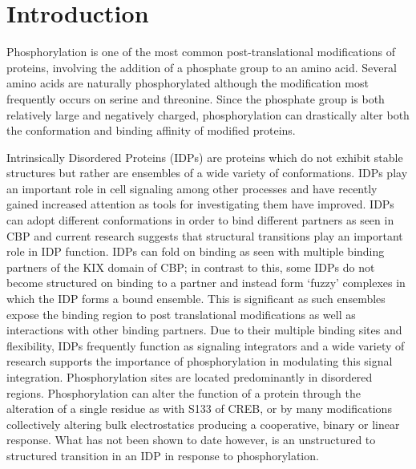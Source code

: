 \section{Introduction} %
\label{sec:introduction}

Phosphorylation is one of the most common post-translational modifications of proteins, involving the addition of a phosphate group to an amino acid.
Several amino acids are naturally phosphorylated although the modification most frequently occurs on serine and threonine.
Since the phosphate group is both relatively large and negatively charged, phosphorylation can drastically alter both the conformation and binding affinity of modified proteins.

Intrinsically Disordered Proteins (IDPs) are proteins which do not exhibit stable structures but rather are ensembles of a wide variety of conformations.
IDPs play an important role in cell signaling among other processes and have recently gained increased attention as tools for investigating them have improved.
IDPs can adopt different conformations in order to bind different partners as seen in CBP\cite{d02,w06,q05} and current research suggests that structural transitions play an important role in IDP function.
IDPs can fold on binding as seen with multiple binding partners of the KIX domain of CBP\cite{stc12,stc14}; in contrast to this, some IDPs do not become structured on binding to a partner and instead form ‘fuzzy’ complexes in which the IDP forms a bound ensemble. \cite{b07,m10,tf08}
This is significant as such ensembles expose the binding region to post translational modifications as well as interactions with other binding partners. \cite{f13}
Due to their multiple binding sites and flexibility, IDPs frequently function as signaling integrators \cite{dcriu05,ksxg08} and a wide variety of research supports the importance of phosphorylation in modulating this signal integration.
Phosphorylation sites are located predominantly in disordered regions. \cite{i04}
Phosphorylation can alter the function of a protein through the alteration of a single residue as with S133 of CREB, \cite{c93,r97} or by many modifications collectively altering bulk electrostatics producing a cooperative, binary or linear response. \cite{n01,lfdym13,lffaw10}
What has not been shown to date however, is an unstructured to structured transition in an IDP in response to phosphorylation.


